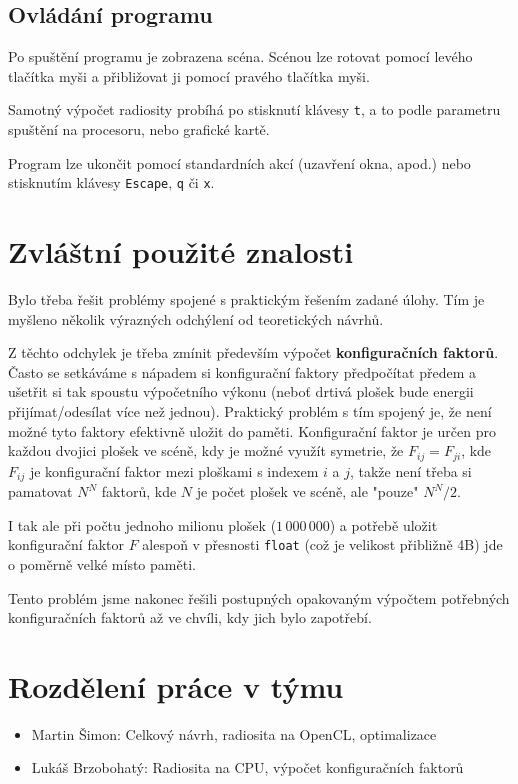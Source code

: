 \documentclass[11pt,a4paper]{article}
\begin{document}
\subsection{Ovládání programu}
Po spuštění programu je zobrazena scéna. Scénou lze rotovat pomocí levého tlačítka myši a přibližovat ji pomocí pravého tlačítka myši.

Samotný výpočet radiosity probíhá po stisknutí klávesy \texttt{t}, a to podle parametru spuštění na procesoru, nebo grafické kartě.

Program lze ukončit pomocí standardních akcí (uzavření okna, apod.) nebo stisknutím klávesy \texttt{Escape}, \texttt{q} či \texttt{x}.


\section{Zvláštní použité znalosti}
Bylo třeba řešit problémy spojené s praktickým řešením zadané úlohy. Tím je myšleno několik výrazných odchýlení od teoretických návrhů.

Z těchto odchylek je třeba zmínit především výpočet \textbf{konfiguračních faktorů}. Často se setkáváme s nápadem si konfigurační faktory předpočítat předem a ušetřit si tak spoustu výpočetního výkonu (neboť drtivá plošek bude energii přijímat/odesílat více než jednou). Praktický problém s tím spojený je, že není možné tyto faktory efektivně uložit do paměti. Konfigurační faktor je určen pro každou dvojici plošek ve scéně, kdy je možné využít symetrie, že $F_{ij} = F_{ji}$, kde $F_{ij}$ je konfigurační faktor mezi ploškami s indexem $i$ a $j$, takže není třeba si pamatovat $N^N$ faktorů, kde $N$ je počet plošek ve scéně, ale "pouze" $N^N/2$.

I tak ale při počtu jednoho milionu plošek ($1\,000\,000$) a potřebě uložit konfigurační faktor $F$ alespoň v přesnosti \texttt{float} (což je velikost přibližně 4B) jde o poměrně velké místo paměti.

Tento problém jsme nakonec řešili postupných opakovaným výpočtem potřebných konfiguračních faktorů až ve chvíli, kdy jich bylo zapotřebí.

\section{Rozdělení práce v týmu}

\begin{itemize}
\item Martin Šimon: Celkový návrh, radiosita na OpenCL, optimalizace
\item Lukáš Brzobohatý: Radiosita na CPU, výpočet konfiguračních faktorů
\end{itemize}
\end{document}
